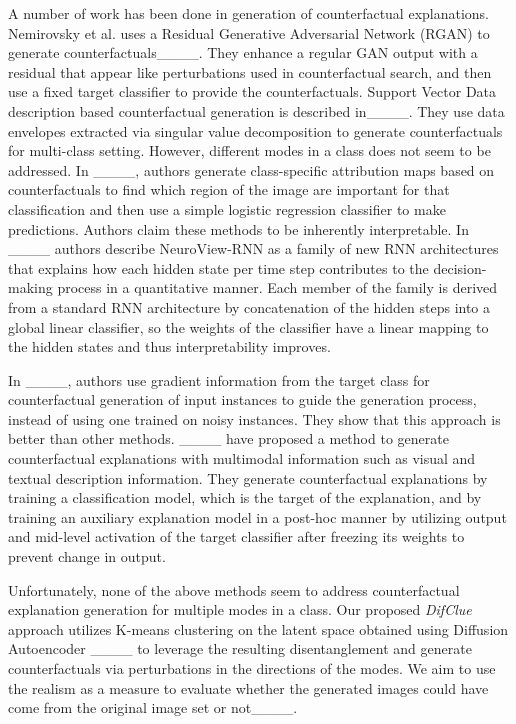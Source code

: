 A number of work has been done in generation of counterfactual explanations. Nemirovsky et al. uses a Residual Generative Adversarial Network (RGAN) to generate counterfactuals____. They enhance a regular GAN output with a residual that appear like perturbations used in counterfactual search, and then use a fixed target classifier to provide the counterfactuals. Support Vector Data description based counterfactual generation is described in____. They use data envelopes extracted via singular value decomposition to generate counterfactuals for multi-class setting. However, different modes in a class does not seem to be addressed. In ____, authors generate class-specific attribution maps based on counterfactuals to find which region of the image are important for that classification and then use a simple logistic regression classifier to make predictions. Authors claim these methods to be inherently interpretable. In ____ authors describe NeuroView-RNN as a family of new RNN architectures that explains how each hidden state per time step contributes to the decision-making process in a quantitative manner. Each member of the family is derived from a standard RNN architecture by concatenation of the hidden steps into a global linear classifier, so the weights of the classifier have a linear mapping to the hidden states and thus interpretability improves.

In ____, authors use gradient information from the target class for counterfactual generation of input instances to guide the generation process, instead of using one trained on noisy instances. They show that this approach is better than other methods. ____ have  proposed a method to generate counterfactual explanations with multimodal information such as visual and textual description information. They generate counterfactual explanations by training a classification model, which is the target of the explanation, and by training an auxiliary explanation model in a post-hoc manner by utilizing output and mid-level activation of the target classifier after freezing its weights to prevent change in output. 

Unfortunately, none of the above methods seem to address counterfactual explanation generation for multiple modes in a class. Our proposed \textit{DifClue} approach utilizes K-means clustering on the latent space obtained using Diffusion Autoencoder ____ to leverage the resulting disentanglement and generate counterfactuals via perturbations in the directions of the modes. We aim to use the realism as a measure to evaluate whether the generated images could have come from the original image set or not____.

